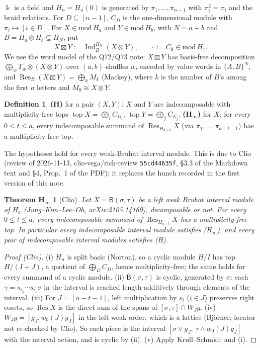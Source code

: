 \documentclass[11pt]{amsart}
\newcommand{\Ind}{\operatorname{Ind}}
\newcommand{\Res}{\operatorname{Res}}
\newcommand{\topp}{\operatorname{top}}
\newcommand{\kk}{\Bbbk}
\newcommand{\sq}{\boxtimes}
\newcommand{\bx}{\square}
\theoremstyle{plain}
\newtheorem*{thmHinf}{Theorem H$_\infty$}
\theoremstyle{definition}
\newtheorem{definition}[theorem]{Definition}
\begin{document}
$\kk$ is a field and $H_n=H_n(0)$ is generated by $\pi_1,\dots,\pi_{n-1}$ with $\pi_i^2=\pi_i$ and the braid relations. For $D\subseteq[n-1]$, $C_D$ is the one-dimensional module with $\pi_i\mapsto[i\in D]$. For $X\in\mathrm{mod}\,H_a$ and $Y\in\mathrm{mod}\,H_b$, with $N=a+b$ and $B=H_a\otimes H_b\subseteq H_N$, put
\[
X\sq Y:=\Ind_{B}^{H_N}(X\otimes Y),\qquad \bx:=C_\emptyset\in\mathrm{mod}\,H_1 .
\]
We use the word model of the Q72/Q73 note: $X\sq Y$ has basis-free decomposition $\bigoplus_w T_w\otimes(X\otimes Y)$ over $(a,b)$-shuffles $w$, encoded by value words in $\{A,B\}^N$, and $\Res_B(X\sq Y)=\bigoplus_k M_k$ (Mackey), where $k$ is the number of $B$'s among the first $a$ letters and $M_0\cong X\otimes Y$.

\begin{definition}
\textbf{(H)} for a pair $(X,Y)$: $X$ and $Y$ are indecomposable with multiplicity-free tops $\topp X=\bigoplus_i C_{D_i}$, $\topp Y=\bigoplus_j C_{E_j}$.
\textbf{(H$_\infty$)} for $X$: for every $0\le t\le a$, every indecomposable summand of $\Res_{H_{a-t}}X$ (via $\pi_1,\dots,\pi_{a-t-1}$) has a multiplicity-free top.
\end{definition}

The hypotheses hold for every weak-Bruhat interval module. This is due to Clio (review of 2026-11-13, clio-vega/rick-review \texttt{55cd44635f}, \S3.3 of the Markdown text and \S4, Prop.~1 of the PDF); it replaces the hunch recorded in the first version of this note.

\begin{thmHinf}[Clio]
Let $X=\mathsf B(\sigma,\tau)$ be a left weak Bruhat interval module of $H_a$ (Jung--Kim--Lee--Oh, arXiv:2105.14169), decomposable or not. For every $0\le t\le a$, every indecomposable summand of $\Res_{H_{a-t}}X$ has a multiplicity-free top. In particular every indecomposable interval module satisfies (H$_\infty$), and every pair of indecomposable interval modules satisfies (H).
\end{thmHinf}

\begin{proof}[Proof (Clio)]
(i) $H_n$ is split basic (Norton), so a cyclic module $H/I$ has top $H/(I+J)$, a quotient of $\bigoplus_D C_D$, hence multiplicity-free; the same holds for every summand of a cyclic module. (ii) $\mathsf B(\sigma,\tau)$ is cyclic, generated by $\sigma$: each $\gamma=s_{i_k}\cdots s_{i_1}\sigma$ in the interval is reached length-additively through elements of the interval. (iii) For $J=[a-t-1]$, left multiplication by $s_i$ ($i\in J$) preserves right cosets, so $\Res X$ is the direct sum of the spans of $[\sigma,\tau]\cap W_Jg$. (iv) $W_Jg=[g_J,w_0(J)g_J]$ in the left weak order, which is a lattice (Bj\"orner; locator not re-checked by Clio). So each piece is the interval $[\sigma\vee g_J,\ \tau\wedge w_0(J)g_J]$ with the interval action, and is cyclic by (ii). (v) Apply Krull--Schmidt and (i).
\end{proof}
\end{document}
